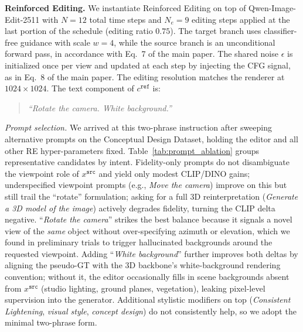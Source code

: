 \documentclass[runningheads]{llncs}
\begin{document}
\textbf{Reinforced Editing.}
We instantiate Reinforced Editing on top of Qwen-Image-Edit-2511 with $N=12$ total time steps and $N_e=9$ editing steps applied at the last portion of the schedule (editing ratio $0.75$).
The target branch uses classifier-free guidance with scale $w=4$, while the source branch is an unconditional forward pass, in accordance with Eq.~7 of the main paper.
The shared noise $\epsilon$ is initialized once per view and updated at each step by injecting the CFG signal, as in Eq.~8 of the main paper.
The editing resolution matches the renderer at $1024\times1024$.
The text component of $c^{\texttt{ref}}$ is:
\begin{quote}
\itshape
``Rotate the camera. White background.''
\end{quote}

\textit{Prompt selection.}
We arrived at this two-phrase instruction after sweeping alternative prompts on the Conceptual Design Dataset, holding the editor and all other RE hyper-parameters fixed.
Table~\ref{tab:prompt_ablation} groups representative candidates by intent.
Fidelity-only prompts do not disambiguate the viewpoint role of $x^{\texttt{src}}$ and yield only modest CLIP/DINO gains; underspecified viewpoint prompts (e.g., \textit{Move the camera}) improve on this but still trail the ``rotate'' formulation; asking for a full 3D reinterpretation (\textit{Generate a 3D model of the image}) actively degrades fidelity, turning the CLIP delta negative.
``\textit{Rotate the camera}'' strikes the best balance because it signals a novel view of the \emph{same} object without over-specifying azimuth or elevation, which we found in preliminary trials to trigger hallucinated backgrounds around the requested viewpoint.
Adding ``\textit{White background}'' further improves both deltas by aligning the pseudo-GT with the 3D backbone's white-background rendering convention; without it, the editor occasionally fills in scene backgrounds absent from $x^{\texttt{src}}$ (studio lighting, ground planes, vegetation), leaking pixel-level supervision into the generator.
Additional stylistic modifiers on top (\textit{Consistent Lightening}, \textit{visual style}, \textit{concept design}) do not consistently help, so we adopt the minimal two-phrase form.
\end{document}

